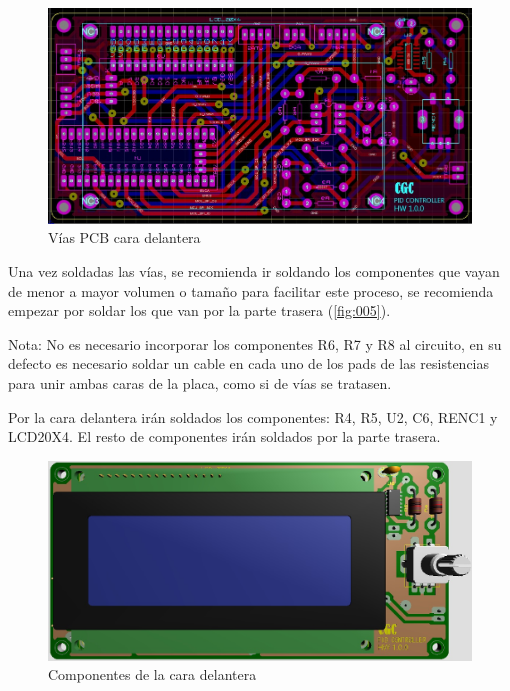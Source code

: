 \documentclass[10pt,a4paper,oneside]{article}
\begin{document}
\begin{figure}[H]
\centering
\includegraphics[scale=0.5]{Imagenes/PCB_CARA_DELANTERA_VIAS.jpg}
\caption[Vista de las vias de la cara delantera de la PCB tras el proceso de insolado]{Vías PCB cara delantera}
\label{fig:003}
\end{figure}

Una vez soldadas las vías, se recomienda ir soldando los componentes que vayan de menor a mayor volumen o tamaño para facilitar este proceso, se recomienda empezar por soldar los que van por la parte trasera (\ref{fig:005}).

Nota: No es necesario incorporar los componentes R6, R7 y R8 al circuito, en su defecto es necesario soldar un cable en cada uno de los pads de las resistencias para unir ambas caras de la placa, como si de vías se tratasen.

Por la cara delantera irán soldados los componentes: R4, R5, U2, C6, RENC1 y LCD20X4. El resto de componentes irán soldados por la parte trasera.

\begin{figure}[H]
\centering
\includegraphics[scale=0.5]{Imagenes/PCB_COMPONENTES_CARA_DELANTERA.jpg}
\caption[Vista de los componentes de la cara delantera de la PCB]{Componentes de la cara delantera}
\label{fig:004}
\end{figure}
\end{document}

